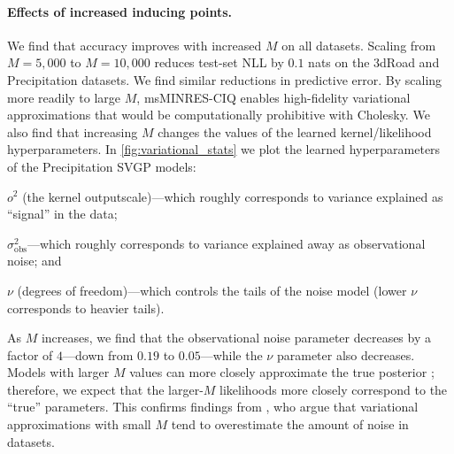 \paragraph{Effects of increased inducing points.}
We find that accuracy improves with increased $M$ on all datasets.
Scaling from $M=5,\!000$ to $M=10,\!000$ reduces test-set NLL by $0.1$ nats on the 3dRoad and Precipitation datasets.
We find similar reductions in predictive error.
By scaling more readily to large $M$, msMINRES-CIQ enables high-fidelity variational approximations that would be computationally prohibitive with Cholesky.
We also find that increasing $M$ changes the values of the learned kernel/likelihood hyperparameters.
In \cref{fig:variational_stats} we plot the learned hyperparameters of the Precipitation SVGP models:
%
\begin{enumerate*}
  \item $o^2$ (the kernel outputscale)---which roughly corresponds to variance explained as ``signal'' in the data;
  \item $\sigma^2_\text{obs}$---which roughly corresponds to variance explained away as observational noise; and
  \item $\nu$ (degrees of freedom)---which controls the tails of the noise model (lower $\nu$ corresponds to heavier tails).
\end{enumerate*}
%
As $M$ increases, we find that the observational noise parameter decreases by a factor of $4$---down from $0.19$ to $0.05$---while the $\nu$ parameter also decreases.
Models with larger $M$ values can more closely approximate the true posterior \cite{hensman2013gaussian}; therefore, we expect that the larger-$M$ likelihoods more closely correspond to the ``true'' parameters.
This confirms findings from \citet{bauer2016understanding}, who argue that variational approximations with small $M$ tend to overestimate the amount of noise in datasets.
